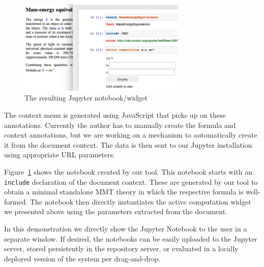 \begin{figure}\vspace*{-2em}
  \includegraphics[width=8cm]{screenshots/emc}\vspace*{-1em}
\caption{The resulting Jupyter notebook/widget}\label{fig:conversionNotebook}\vspace*{-2em}
\end{figure}
The context menu is generated using JavaScript that picks up on these annotations.
Currently the author has to manually create the formula and context annotations, but we are working on a mechanism to automatically create it from the document context.
The data is then sent to our Jupyter installation using appropriate URL parameters. 

Figure~\ref{fig:conversionNotebook} shows the notebook created by our tool.
This notebook starts with an \texttt{include} declaration of the document context. 
These are generated by our tool to obtain a minimal standalone MMT theory in which the respective formula is well-formed. 
The notebook then directly instantiates the active computation widget we presented above using the parameters extracted from the document. 

In this demonstration we directly show the Jupyter Notebook to the user in a separate window. 
If desired, the notebooks can be easily uploaded to the Jupyter server, stored persistently in the repository server, or evaluated in a locally deployed version of the system per drag-and-drop.


